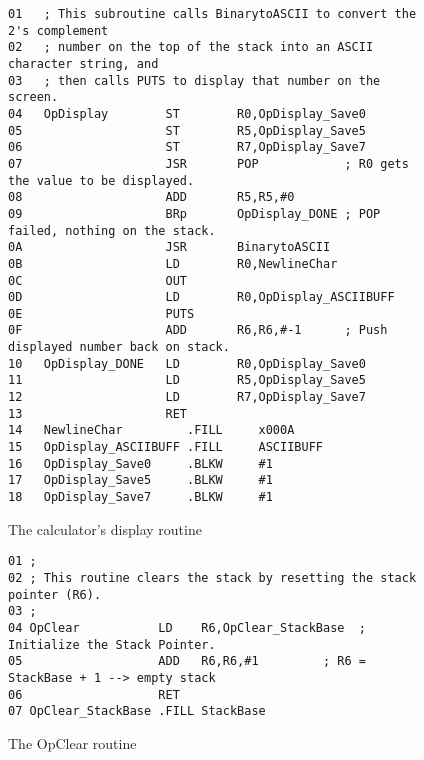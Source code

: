 \documentclass{patt}
\begin{document}
\begin{figure}
\begin{minipage}{36pc}
\begin{Verbatim}[fontsize=\fontsize{9}{10}\selectfont]
01   ; This subroutine calls BinarytoASCII to convert the 2's complement
02   ; number on the top of the stack into an ASCII character string, and
03   ; then calls PUTS to display that number on the screen.
04   OpDisplay        ST        R0,OpDisplay_Save0
05                    ST        R5,OpDisplay_Save5
06                    ST        R7,OpDisplay_Save7
07                    JSR       POP            ; R0 gets the value to be displayed.
08                    ADD       R5,R5,#0
09                    BRp       OpDisplay_DONE ; POP failed, nothing on the stack.
0A                    JSR       BinarytoASCII
0B                    LD        R0,NewlineChar
0C                    OUT
0D                    LD        R0,OpDisplay_ASCIIBUFF
0E                    PUTS
0F                    ADD       R6,R6,#-1      ; Push displayed number back on stack.
10   OpDisplay_DONE   LD        R0,OpDisplay_Save0
11                    LD        R5,OpDisplay_Save5
12                    LD        R7,OpDisplay_Save7
13                    RET
14   NewlineChar         .FILL     x000A
15   OpDisplay_ASCIIBUFF .FILL     ASCIIBUFF
16   OpDisplay_Save0     .BLKW     #1
17   OpDisplay_Save5     .BLKW     #1
18   OpDisplay_Save7     .BLKW     #1
\end{Verbatim}
\caption{The calculator's display routine}
\label{fig:code.display}
\end{minipage}
\end{figure}

\begin{figure}
\begin{Verbatim}[fontsize=\fontsize{9}{11}\selectfont]
01 ;
02 ; This routine clears the stack by resetting the stack pointer (R6).
03 ;
04 OpClear           LD    R6,OpClear_StackBase  ; Initialize the Stack Pointer.
05                   ADD   R6,R6,#1         ; R6 = StackBase + 1 --> empty stack
06                   RET
07 OpClear_StackBase .FILL StackBase
\end{Verbatim}
\caption{The OpClear routine}
\label{fig:code.opclear}
\end{figure}

\clearpage
\end{document}
